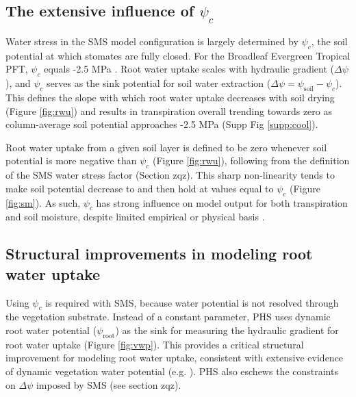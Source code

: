 \documentclass[draft,linenumbers]{agujournal}
\begin{document}
\subsection{The extensive influence of $\psi_c$}
    Water stress in the SMS model configuration is largely determined by 
    $\psi_c$, the soil potential at which stomates are fully closed.
    For the Broadleaf Evergreen Tropical PFT, $\psi_c$ equals -2.5 MPa \citep{oleson2013}.
    Root water uptake scales with hydraulic gradient ($\Delta\psi$), and
    $\psi_c$ serves as the sink potential for soil water extraction ($\Delta\psi = \psi_{\text{soil}}-\psi_c$).
    This defines the slope with which root water uptake decreases with soil drying (Figure \ref{fig:rwu})
    and results in transpiration overall trending towards zero as column-average soil potential approaches -2.5 MPa (Supp Fig \ref{supp:cool}).
    
    Root water uptake from a given soil layer is defined to be zero whenever soil potential is more negative than $\psi_c$ (Figure \ref{fig:rwu}),  
    following from the definition of the SMS water stress factor (Section zqz).
    This sharp non-linearity tends to make soil potential decrease to and then hold at values equal to $\psi_c$ (Figure \ref{fig:sm}).
    As such, $\psi_c$ has strong influence on model output for both transpiration and soil moisture, despite limited empirical or physical basis \citep{rogers2017}.
    
\subsection{Structural improvements in modeling root water uptake}

    Using $\psi_c$ is required with SMS, because water potential is not resolved through the vegetation substrate.
    Instead of a constant parameter, PHS uses dynamic root water potential ($\psi_{\text{root}}$) as the sink for measuring the hydraulic gradient for root water uptake (Figure \ref{fig:vwp}).
    This provides a critical structural improvement for modeling root water uptake, consistent with extensive evidence of dynamic vegetation water potential (e.g. \cite{fisher2006}).
    PHS also eschews the constraints on $\Delta\psi$ imposed by SMS (see section zqz).
    
\end{document}

